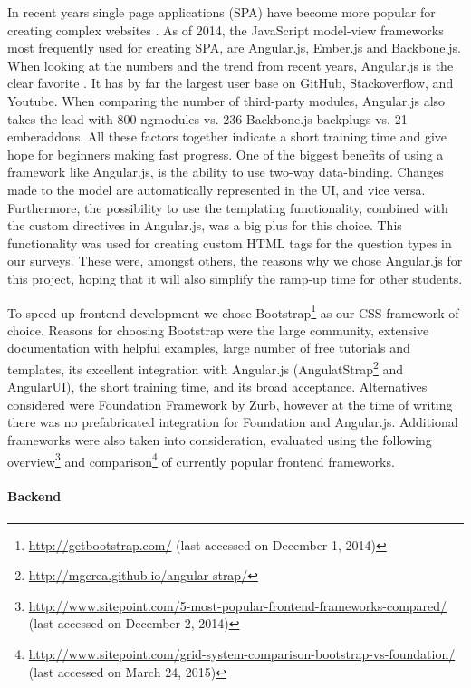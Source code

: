 		In recent years single page applications (SPA) have become more popular for creating complex websites \cite{Medium2013SPA, Tutsplus2013SPA}. As of 2014, the JavaScript model-view frameworks most frequently used for creating SPA, are Angular.js, Ember.js and Backbone.js. When looking at the numbers and the trend from recent years, Angular.js is the clear favorite \cite{AirPair2014MEAN}. It has by far the largest user base on GitHub, Stackoverflow, and Youtube. When comparing the number of third-party modules, Angular.js also takes the lead with 800 ngmodules vs. 236 Backbone.js backplugs vs. 21 emberaddons. All these factors together indicate a short training time and give hope for beginners making fast progress. One of the biggest benefits of using a framework like Angular.js, is the ability to use two-way data-binding. Changes made to the model are automatically represented in the UI, and vice versa. Furthermore, the possibility to use the templating functionality, combined with the custom directives in Angular.js, was a big plus for this choice. This functionality was used for creating custom HTML tags for the question types in our surveys. These were, amongst others, the reasons why we chose Angular.js for this project, hoping that it will also simplify the ramp-up time for other students.

		To speed up frontend development we chose Bootstrap\footnote{\url{http://getbootstrap.com/} (last accessed on December 1, 2014)} as our CSS framework of choice. Reasons for choosing Bootstrap were the large community, extensive documentation with helpful examples, large number of free tutorials and templates, its excellent integration with Angular.js (AngulatStrap\footnote{\url{http://mgcrea.github.io/angular-strap/}} and AngularUI), the short training time, and its broad acceptance.
		Alternatives considered were Foundation Framework by Zurb, however at the time of writing there was no prefabricated integration for Foundation and Angular.js.
		Additional frameworks were also taken into consideration, evaluated using the following overview\footnote{\url{http://www.sitepoint.com/5-most-popular-frontend-frameworks-compared/} (last accessed on December 2, 2014)} and comparison\footnote{\url{http://www.sitepoint.com/grid-system-comparison-bootstrap-vs-foundation/} (last accessed on March 24, 2015)} of currently popular frontend frameworks.
	

	\paragraph{Backend}

